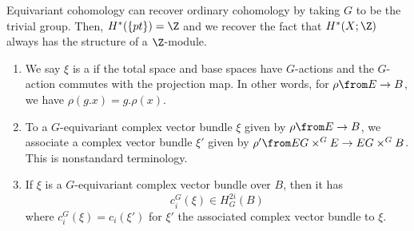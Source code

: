 \documentclass[11pt,leqno,oneside]{amsbook}
\numberwithin{thm}{section}
\begin{document}
\begin{rmk}
  Equivariant cohomology can recover ordinary cohomology by taking
  \(G\) to be the trivial group. Then, \(H^*(\{pt\}) = \Z\) and we
  recover the fact that \(H^*(X;\Z)\) always has the structure of a
  \(\Z\)-module. 
\end{rmk}
\begin{defn}
  \begin{enumerate}
  \item We say \(\xi\) is a  if
    the total space and base spaces have \(G\)-actions and the
    \(G\)-action commutes with the projection map. In other words, for
    \(\rho \from E \to B\), we have \(\rho(g.x) = g.\rho(x)\).
  \item To a \(G\)-equivariant complex vector bundle \(\xi\) given by
    \(\rho \from E \to B\), we associate a
    complex vector bundle \(\xi'\) given by \(\rho' \from EG \times^G
    E \to EG \times^G B\). This is nonstandard terminology. 
  \item If \(\xi\) is a \(G\)-equivariant complex vector bundle over
    \(B\), then it has  \[
      c_i^G(\xi) \in H_G^{2i}(B)
    \]
    where \(c_i^G(\xi) = c_i(\xi')\) for \(\xi'\) the associated
    complex vector bundle to \(\xi\).
  \end{enumerate}
\end{defn}
\begin{bibdiv}
  \begin{biblist}
  \end{biblist}
\end{bibdiv}
\end{document}
